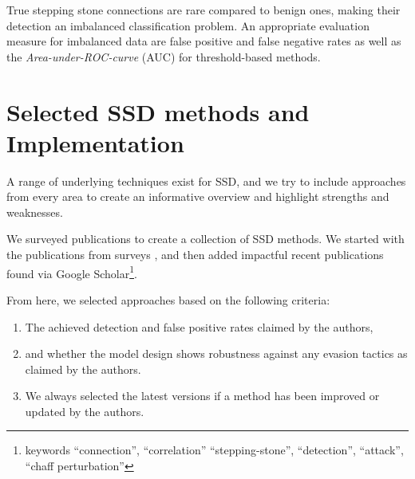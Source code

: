 \documentclass[runningheads,11pt]{llncs}\usepackage[]{graphicx}\usepackage[]{color}
\begin{document}

True stepping stone connections are rare compared to benign ones, making their detection an imbalanced classification problem. An appropriate evaluation measure for imbalanced data are false positive and false negative rates as well as the \textit{Area-under-ROC-curve} (AUC) for threshold-based methods.


\section{Selected SSD methods and Implementation}\label{Sec:Selection}

A range of underlying techniques exist for SSD, and we try to include approaches from every area to create an informative overview and highlight strengths and weaknesses. 

We surveyed publications to create a collection of SSD methods. We started with the publications from surveys \cite{shullich2011survey,wang2018research}, and then added impactful recent publications found via Google Scholar\footnote{keywords ``connection'', ``correlation'' ``stepping-stone'', ``detection'', ``attack'', ``chaff perturbation''}.

From here, we selected approaches based on the following criteria:


\begin{enumerate}
\item The achieved detection and false positive rates claimed by the authors,
\item and whether the model design shows robustness against any evasion tactics as claimed by the authors.
\item We always selected the latest versions if a method has been improved or updated by the authors.
\end{enumerate}
\end{document}
